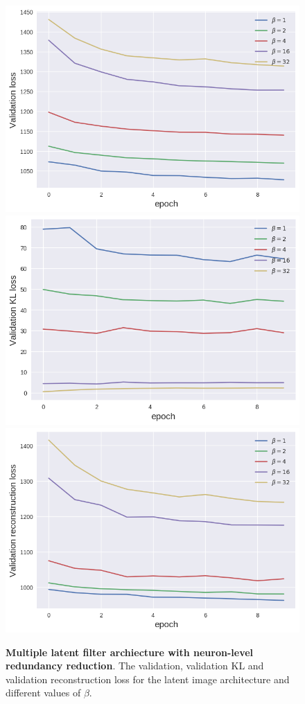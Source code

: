 \begin{figure}[h!]
\centering
\captionsetup{justification=centering}
    \includegraphics[scale=0.5]{figures/results/indiscriminate_decoupling/val_loss.png}
    \includegraphics[scale=0.5]{figures/results/indiscriminate_decoupling/val_kl_loss.png}
    \includegraphics[scale=0.5]{figures/results/indiscriminate_decoupling/val_reconstruction_loss.png}
\caption{\textbf{Multiple latent filter archiecture with neuron-level redundancy reduction}. The validation, validation KL and validation reconstruction loss for the latent image architecture and different values of $\beta$.}
\label{fig:indiscriminate_decoupling_graphs}
\end{figure}
